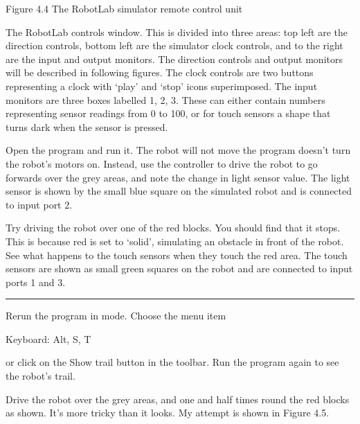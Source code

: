 \documentclass[letterpaper,10pt,english]{sphinxmanual}
\begin{document}

Figure 4.4 The RobotLab simulator remote control unit

The RobotLab controls window. This is divided into three areas: top left are the direction controls, bottom left are the simulator clock controls, and to the right are the input and output monitors. The direction controls and output monitors will be described in following figures. The clock controls are two buttons representing a clock with ‘play’ and ‘stop’ icons superimposed. The input monitors are three boxes labelled 1, 2, 3. These can either contain numbers representing sensor readings from
0 to 100, or for touch sensors a shape that turns dark when the sensor is pressed.

Open the  program and run it. The robot will not move \textendash{} the program doesn’t turn the robot’s motors on. Instead, use the controller to drive the robot to go forwards over the grey areas, and note the change in light sensor value. The light sensor is shown by the small blue square on the simulated robot and is connected to input port 2.

Try driving the robot over one of the red blocks. You should find that it stops. This is because red is set to ‘solid’, simulating an obstacle in front of the robot. See what happens to the touch sensors when they touch the red area. The touch sensors are shown as small green squares on the robot and are connected to input ports 1 and 3.


\bigskip\hrule\bigskip


Rerun the  program in  mode. Choose the  menu item





Keyboard: Alt, S, T





or click on the Show trail  button in the toolbar. Run the program again to see the robot’s trail.

Drive the robot over the grey areas, and one and half times round the red blocks as shown. It’s more tricky than it looks. My attempt is shown in Figure 4.5.
\end{document}
